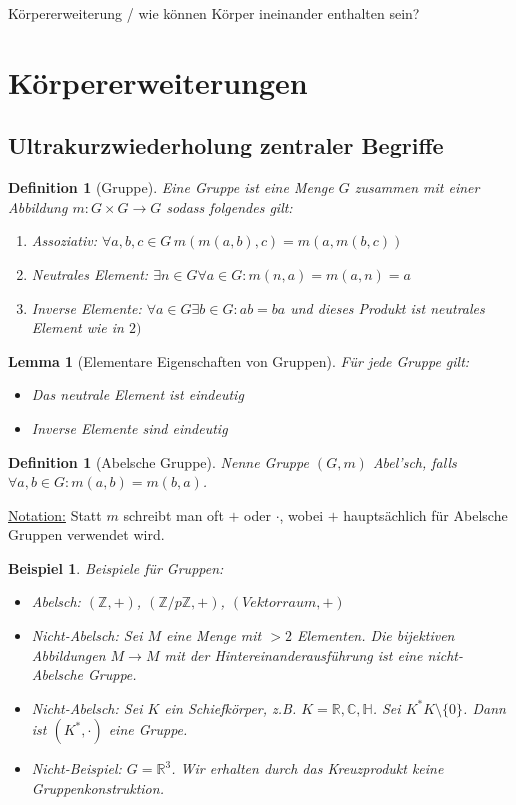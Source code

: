 \documentclass[a4paper,12pt,numbers=noenddot,parskip=full]{scrartcl}
\newcommand{\setZ}{\mathbb{Z}}
\newcommand{\setR}{\mathbb{R}}
\newcommand{\setC}{\mathbb{C}}
\newcommand{\setH}{\mathbb{H}}
\newcommand{\heading}{\underline}
\theoremstyle{dotless}
\newtheorem{lemma}[theorem]{Lemma}
\newtheorem{definition}[theorem]{Definition}
\newtheorem{example}[theorem]{Beispiel}
\theoremstyle{remark}
\begin{document}
	Körpererweiterung / wie können Körper ineinander enthalten sein?	
	
	\section{Körpererweiterungen}
	
	\subsection{Ultrakurzwiederholung zentraler Begriffe}
	
	\begin{definition}[Gruppe]
		Eine Gruppe ist eine Menge $G$ zusammen mit einer Abbildung $m: G \times G \to G$ sodass folgendes gilt:
		\begin{enumerate}
			\item Assoziativ: $\forall a,b,c \in G \, m(m(a,b), c) = m(a, m(b,c))$
			\item Neutrales Element: $\exists n \in G \forall a \in G: m(n,a) = m(a,n) = a$
			\item Inverse Elemente: $\forall a \in G \exists b \in G: ab = ba$ und dieses Produkt ist neutrales Element wie in $2)$
		\end{enumerate}
	\end{definition}

	\begin{lemma}[Elementare Eigenschaften von Gruppen]
		Für jede Gruppe gilt:
		\begin{itemize}
			\item Das neutrale Element ist eindeutig
			\item Inverse Elemente sind eindeutig
		\end{itemize}
	\end{lemma}

	\begin{definition}[Abelsche Gruppe]
		Nenne Gruppe $(G,m)$ Abel'sch, falls $\forall a,b \in G: m(a,b) = m(b,a)$.
	\end{definition}

	\heading{Notation:} Statt $m$ schreibt man oft $+$ oder $\cdot$, wobei $+$ hauptsächlich für Abelsche Gruppen verwendet wird.
	
	\begin{example}
		Beispiele für Gruppen:
		\begin{itemize}
			\item \emph{Abelsch}: $(\setZ, +)$, $(\setZ / p\setZ, +)$, $(Vektorraum, +)$
			\item \emph{Nicht-Abelsch}: Sei $M$ eine Menge mit $>2$ Elementen. Die bijektiven Abbildungen $M \to M$ mit der Hintereinanderausführung ist eine nicht-Abelsche Gruppe.
			
			\item \emph{Nicht-Abelsch}: Sei $K$ ein Schiefkörper, z.B. $K = \setR, \setC, \setH$. Sei $K^* K \setminus \{0\}$. Dann ist $(K^*, \cdot)$ eine Gruppe.
			\item \emph{Nicht-Beispiel}: $G = \setR^3$. Wir erhalten durch das Kreuzprodukt keine Gruppenkonstruktion.
		\end{itemize}
	\end{example}
\end{document}
